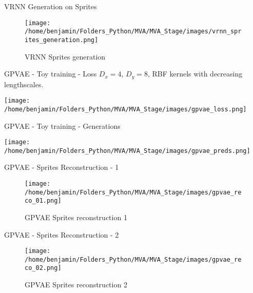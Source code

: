 
\begin{frame}{VRNN Generation on Sprites}
    \begin{figure}[H]
        \centering
        \texttt{[image: /home/benjamin/Folders\_Python/MVA/MVA\_Stage/images/vrnn\_sprites\_generation.png]}
        \caption{VRNN Sprites generation}
        \label{fig:sprite generation}
    \end{figure}
\end{frame}


\begin{frame}{GPVAE - Toy training - Loss}
    $D_x = 4$, $D_y=8$, RBF kernels with decreasing lengthscales.
    \begin{center}
    \texttt{[image: /home/benjamin/Folders\_Python/MVA/MVA\_Stage/images/gpvae\_loss.png]}
    \end{center}
\end{frame}

\begin{frame}{GPVAE - Toy training - Generations}
    \begin{center}
    \texttt{[image: /home/benjamin/Folders\_Python/MVA/MVA\_Stage/images/gpvae\_preds.png]}
    \end{center}
\end{frame}

\begin{frame}{GPVAE - Sprites Reconstruction - 1}
    \begin{figure}[H]
    \centering
    \texttt{[image: /home/benjamin/Folders\_Python/MVA/MVA\_Stage/images/gpvae\_reco\_01.png]}
    \caption{GPVAE Sprites reconstruction 1}
    \label{fig:GPVAE Sprites reconstruction 1}
\end{figure}
\end{frame}

\begin{frame}{GPVAE - Sprites Reconstruction - 2}
\begin{figure}[H]
    \centering
    \texttt{[image: /home/benjamin/Folders\_Python/MVA/MVA\_Stage/images/gpvae\_reco\_02.png]}
    \caption{GPVAE Sprites reconstruction 2}
    \label{fig:GPVAE Sprites reconstruction 2}
\end{figure}
\end{frame}

